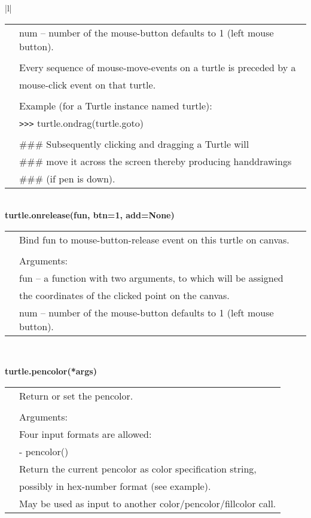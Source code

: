 \begin{center}
{\begin{tabular}{|l|}
\begin{tabular}{p{0.25in}p{4in}}
&        num -- number of the mouse-button defaults to 1 (left mouse button). \\
&  \\
&        Every sequence of mouse-move-events on a turtle is preceded by a \\
&        mouse-click event on that turtle. \\
&  \\
&        Example (for a Turtle instance named turtle): \\
&        \verb+>+\verb+>+\verb+>+ turtle.ondrag(turtle.goto) \\
&  \\
&        \#\#\# Subsequently clicking and dragging a Turtle will \\
&        \#\#\# move it across the screen thereby producing handdrawings \\
&        \#\#\# (if pen is down). \\
\end{tabular} \\ \hline
{\bf    turtle.onrelease(fun, btn=1, add=None)} \\
   \begin{tabular}{p{0.25in}p{4in}}
&        Bind fun to mouse-button-release event on this turtle on canvas. \\
&  \\
&        Arguments: \\
&        fun -- a function with two arguments, to which will be assigned \\
&                the coordinates of the clicked point on the canvas. \\
&        num --  number of the mouse-button defaults to 1 (left mouse button). \\
\end{tabular} \\ \hline

{\bf    turtle.pencolor(*args)} \\
   \begin{tabular}{p{0.25in}p{4in}}
&        Return or set the pencolor. \\
&  \\
&        Arguments: \\
&        Four input formats are allowed: \\
&          - pencolor() \\
&            Return the current pencolor as color specification string, \\
&            possibly in hex-number format (see example). \\
&            May be used as input to another color/pencolor/fillcolor call. \\
\end{tabular} \\ \hline
\end{tabular}}
\end{center}
